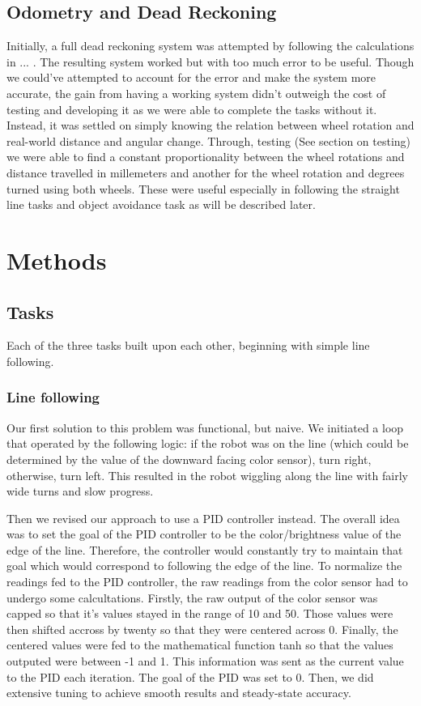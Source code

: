 \documentclass[12pt]{article}
\begin{document}
\subsection{Odometry and Dead Reckoning}
Initially, a full dead reckoning system was attempted by following the calculations in ... . The resulting system worked but with too much error to be useful. Though we could've attempted to account for the error and make the system more accurate, the gain from having a working system didn't outweigh the cost of testing and developing it as we were able to complete the tasks without it.
Instead, it was settled on simply knowing the relation between wheel rotation and real-world distance and angular change. Through, testing (See section on testing) we were able to find a constant proportionality between the wheel rotations and distance travelled in millemeters and another for the wheel rotation and degrees turned using both wheels. These were useful especially in following the straight line tasks and object avoidance task as will be described later. 


\section{Methods}

\subsection{Tasks}

Each of the three tasks built upon each other, beginning with simple line following.

\subsubsection{Line following}

Our first solution to this problem was functional, but naive. We initiated a loop that operated by the following logic: if the robot was on the line (which could be determined by the value of the downward facing color sensor), turn right, otherwise, turn left. This resulted in the robot wiggling along the line with fairly wide turns and slow progress.

Then we revised our approach to use a PID controller instead. The overall idea was to set the goal of the PID controller to be the color/brightness value of the edge of the line. Therefore, the controller would constantly try to maintain that goal which would correspond to following the edge of the line. To normalize the readings fed to the PID controller, the raw readings from the color sensor had to undergo some calcultations. Firstly, the raw output of the color sensor was capped so that it's values stayed in the range of 10 and 50. Those values were then shifted accross by twenty so that they were centered across 0. Finally, the centered values were fed to the mathematical function tanh so that the values outputed were between -1 and 1. This information was sent as the current value to the PID each iteration. The goal of the PID was set to 0. Then, we did extensive tuning to achieve smooth results and steady-state accuracy.
\end{document}
